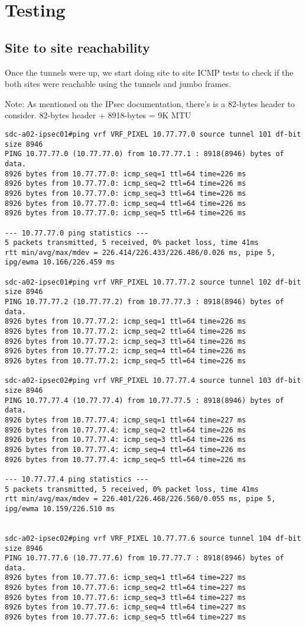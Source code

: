 \section{Testing}

\subsection{Site to site reachability}
Once the tunnels were up, we start doing site to site ICMP tests to check if the both sites were reachable using the tunnels and jumbo frames. 

Note: As mentioned on the IPsec documentation, there's is a 82-bytes header to consider. 
82-bytes header + 8918-bytes  = 9K MTU 

    \begin{lstlisting}
sdc-a02-ipsec01#ping vrf VRF_PIXEL 10.77.77.0 source tunnel 101 df-bit size 8946
PING 10.77.77.0 (10.77.77.0) from 10.77.77.1 : 8918(8946) bytes of data.
8926 bytes from 10.77.77.0: icmp_seq=1 ttl=64 time=226 ms
8926 bytes from 10.77.77.0: icmp_seq=2 ttl=64 time=226 ms
8926 bytes from 10.77.77.0: icmp_seq=3 ttl=64 time=226 ms
8926 bytes from 10.77.77.0: icmp_seq=4 ttl=64 time=226 ms
8926 bytes from 10.77.77.0: icmp_seq=5 ttl=64 time=226 ms

--- 10.77.77.0 ping statistics ---
5 packets transmitted, 5 received, 0% packet loss, time 41ms
rtt min/avg/max/mdev = 226.414/226.433/226.486/0.026 ms, pipe 5, 
ipg/ewma 10.166/226.459 ms

sdc-a02-ipsec01#ping vrf VRF_PIXEL 10.77.77.2 source tunnel 102 df-bit size 8946
PING 10.77.77.2 (10.77.77.2) from 10.77.77.3 : 8918(8946) bytes of data.
8926 bytes from 10.77.77.2: icmp_seq=1 ttl=64 time=226 ms
8926 bytes from 10.77.77.2: icmp_seq=2 ttl=64 time=226 ms
8926 bytes from 10.77.77.2: icmp_seq=3 ttl=64 time=226 ms
8926 bytes from 10.77.77.2: icmp_seq=4 ttl=64 time=226 ms
8926 bytes from 10.77.77.2: icmp_seq=5 ttl=64 time=226 ms

sdc-a02-ipsec02#ping vrf VRF_PIXEL 10.77.77.4 source tunnel 103 df-bit size 8946
PING 10.77.77.4 (10.77.77.4) from 10.77.77.5 : 8918(8946) bytes of data.
8926 bytes from 10.77.77.4: icmp_seq=1 ttl=64 time=227 ms
8926 bytes from 10.77.77.4: icmp_seq=2 ttl=64 time=226 ms
8926 bytes from 10.77.77.4: icmp_seq=3 ttl=64 time=226 ms
8926 bytes from 10.77.77.4: icmp_seq=4 ttl=64 time=226 ms
8926 bytes from 10.77.77.4: icmp_seq=5 ttl=64 time=226 ms

--- 10.77.77.4 ping statistics ---
5 packets transmitted, 5 received, 0% packet loss, time 41ms
rtt min/avg/max/mdev = 226.401/226.468/226.560/0.055 ms, pipe 5, 
ipg/ewma 10.159/226.510 ms


sdc-a02-ipsec02#ping vrf VRF_PIXEL 10.77.77.6 source tunnel 104 df-bit size 8946
PING 10.77.77.6 (10.77.77.6) from 10.77.77.7 : 8918(8946) bytes of data.
8926 bytes from 10.77.77.6: icmp_seq=1 ttl=64 time=227 ms
8926 bytes from 10.77.77.6: icmp_seq=2 ttl=64 time=227 ms
8926 bytes from 10.77.77.6: icmp_seq=3 ttl=64 time=227 ms
8926 bytes from 10.77.77.6: icmp_seq=4 ttl=64 time=227 ms
8926 bytes from 10.77.77.6: icmp_seq=5 ttl=64 time=227 ms
\end{lstlisting}

